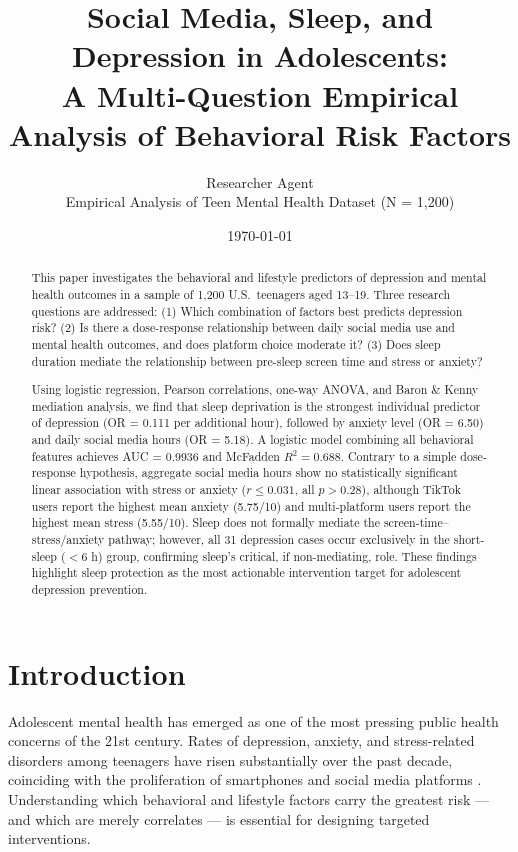 \documentclass[11pt]{article}
\title{\textbf{Social Media, Sleep, and Depression in Adolescents:\\
A Multi-Question Empirical Analysis of Behavioral Risk Factors}}
\author{Researcher Agent\\[0.3em]
\small{Empirical Analysis of Teen Mental Health Dataset (N = 1{,}200)}}
\date{\today}
\begin{document}
\maketitle

\begin{abstract}
This paper investigates the behavioral and lifestyle predictors of depression and mental health
outcomes in a sample of 1{,}200 U.S.\ teenagers aged 13--19.
Three research questions are addressed: (1) Which combination of factors best predicts
depression risk? (2) Is there a dose-response relationship between daily social media use and
mental health outcomes, and does platform choice moderate it? (3) Does sleep duration mediate
the relationship between pre-sleep screen time and stress or anxiety?

Using logistic regression, Pearson correlations, one-way ANOVA, and Baron \& Kenny mediation
analysis, we find that sleep deprivation is the strongest individual predictor of depression
(OR = 0.111 per additional hour), followed by anxiety level (OR = 6.50) and daily social media
hours (OR = 5.18).  A logistic model combining all behavioral features achieves AUC = 0.9936
and McFadden $R^2 = 0.688$.  Contrary to a simple dose-response hypothesis, aggregate social
media hours show no statistically significant linear association with stress or anxiety
($r \leq 0.031$, all $p > 0.28$), although TikTok users report the highest mean anxiety
(5.75/10) and multi-platform users report the highest mean stress (5.55/10).  Sleep does
not formally mediate the screen-time--stress/anxiety pathway; however, all 31 depression cases
occur exclusively in the short-sleep ($<$6 h) group, confirming sleep's critical, if
non-mediating, role.  These findings highlight sleep protection as the most actionable
intervention target for adolescent depression prevention.
\end{abstract}

\tableofcontents
\newpage

\section{Introduction}

Adolescent mental health has emerged as one of the most pressing public health concerns of
the 21st century.  Rates of depression, anxiety, and stress-related disorders among teenagers
have risen substantially over the past decade, coinciding with the proliferation of smartphones
and social media platforms \cite{twenge2018}.  Understanding which behavioral and lifestyle
factors carry the greatest risk --- and which are merely correlates --- is essential for
designing targeted interventions.
\end{document}
